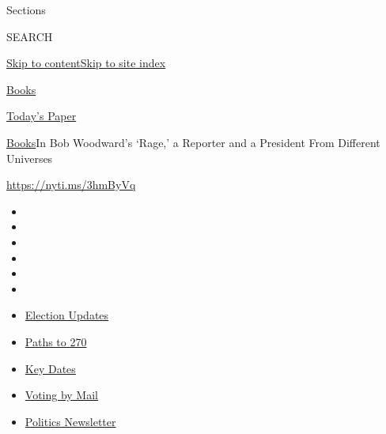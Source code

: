 Sections

SEARCH

\protect\hyperlink{site-content}{Skip to
content}\protect\hyperlink{site-index}{Skip to site index}

\href{https://www.nytimes3xbfgragh.onion/section/books}{Books}

\href{https://myaccount.nytimes3xbfgragh.onion/auth/login?response_type=cookie\&client_id=vi}{}

\href{https://www.nytimes3xbfgragh.onion/section/todayspaper}{Today's
Paper}

\href{/section/books}{Books}\textbar{}In Bob Woodward's `Rage,' a
Reporter and a President From Different Universes

\url{https://nyti.ms/3hmByVq}

\begin{itemize}
\item
\item
\item
\item
\item
\item
\end{itemize}

\begin{itemize}
\item
  \href{https://www.nytimes3xbfgragh.onion/live/2020/09/11/us/trump-vs-biden?action=click\&pgtype=Article\&state=default\&region=TOP_BANNER\&context=storylines_menu}{Election
  Updates}
\item
  \href{https://www.nytimes3xbfgragh.onion/interactive/2020/us/elections/election-states-biden-trump.html?action=click\&pgtype=Article\&state=default\&region=TOP_BANNER\&context=storylines_menu}{Paths
  to 270}
\item
  \href{https://www.nytimes3xbfgragh.onion/interactive/2019/us/elections/2020-presidential-election-calendar.html?action=click\&pgtype=Article\&state=default\&region=TOP_BANNER\&context=storylines_menu}{Key
  Dates}
\item
  \href{https://www.nytimes3xbfgragh.onion/interactive/2020/08/31/us/politics/vote-by-mail-deadlines.html?action=click\&pgtype=Article\&state=default\&region=TOP_BANNER\&context=storylines_menu}{Voting
  by Mail}
\item
  \href{https://www.nytimes3xbfgragh.onion/newsletters/politics?action=click\&pgtype=Article\&state=default\&region=TOP_BANNER\&context=storylines_menu}{Politics
  Newsletter}
\end{itemize}


